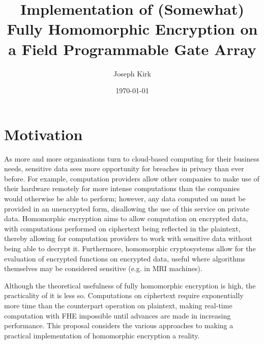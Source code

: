 \documentclass[dvips,12pt]{article}
\begin{document}

\title{Implementation of (Somewhat) Fully Homomorphic Encryption on a Field Programmable Gate Array}
\author{Joseph Kirk}
\date{\today}



\maketitle


\section{Motivation}


As more and more organisations turn to cloud-based computing for their business needs, 
sensitive data sees more opportunity for breaches in privacy than ever before. For example,
computation providers allow other companies to make use of their hardware remotely for
more intense computations than the companies would otherwise be able to perform; however,
any data computed on must be provided in an unencrypted form, disallowing the use of
this service on private data. Homomorphic encryption aims to allow computation on encrypted
data, with computations performed on ciphertext being reflected in the plaintext, thereby allowing
for computation providers to work with sensitive data without being able to decrypt it. Furthermore,
homomorphic cryptosystems allow for the evaluation of encrypted functions on encrypted data,
useful where algorithms themselves may be considered sensitive (e.g. in MRI machines).
\par Although the theoretical usefulness of fully homomorphic encryption is high, the practicality of it is less so.
Computations on ciphertext require exponentially more time than the counterpart operation on 
plaintext, making real-time computation with FHE impossible until advances are made in
increasing performance. This proposal considers the various approaches to making a practical
implementation of homomorphic encryption a reality.
\end{document}
